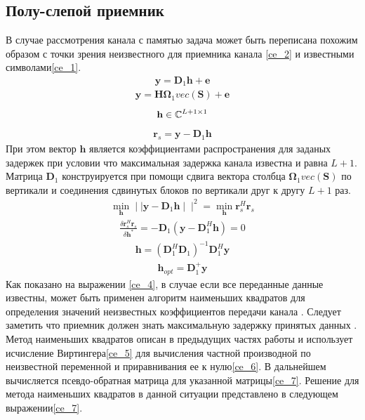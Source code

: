 \subsection{Полу-слепой приемник}
В случае рассмотрения канала с памятью задача может быть переписана похожим образом с точки зрения неизвестного для приемника канала \eqref{ce_2}  и известными символами\eqref{ce_1}.
\begin{align}
\mathbf{y}=\mathbf{D}_1\mathbf{h}+\mathbf{e}
\label{ce_1}
\end{align}
\begin{align}
\mathbf{y}=\mathbf{H}\mathbf{\Omega}_1vec(\mathbf{S})+\mathbf{e}
\label{ce_2}
\end{align}
\begin{align*}
\mathbf{h}\in\mathbb{C}^{L+1\times 1}
\end{align*}
\begin{align}
\mathbf{r}_s=\mathbf{y}-\mathbf{D}_1\mathbf{h}
\label{ce_3}
\end{align}
При этом вектор $\mathbf{h}$  является коэффициентами распространения для заданых задержек при условии что максимальная задержка канала известна и равна $L+1$. Матрица $\mathbf{D}_1$ конструируется при помощи сдвига вектора столбца $\mathbf{\Omega}_1vec(\mathbf{S})$ по вертикали и  соединения сдвинутых блоков по вертикали друг к другу $L+1$ раз\cite{Book53}.
\begin{align}
\min_{\mathbf{h}} \mid \mid\mathbf{y}-\mathbf{D}_1\mathbf{h} \mid \mid^2=\min_{\mathbf{h}}\mathbf{r}_s^H\mathbf{r}_s
\label{ce_4}
\end{align}
\begin{align}
\frac{\delta\mathbf{r}_s^H\mathbf{r}_s}{\delta\mathbf{h}^*}=-\mathbf{D}_1(\mathbf{y}-\mathbf{D}_1^H\mathbf{h})=0
\label{ce_5}
\end{align}
\begin{align}
\mathbf{h}=(\mathbf{D}_1^H\mathbf{D}_1)^{-1}\mathbf{D}_1^H\mathbf{y}
\label{ce_6}
\end{align}
\begin{align}
\mathbf{h}_{opt}=\mathbf{D}_1^+\mathbf{y}
\label{ce_7}
\end{align}
Как показано на выражении \eqref{ce_4}, в случае если все переданные данные известны, может быть применен алгоритм наименьших квадратов для определения значений неизвестных коэффициентов передачи канала \cite{Book47}. Следует заметить что приемник должен знать максимальную задержку принятых данных . Метод наименьших квадратов описан в предыдущих частях работы и использует исчисление Виртингера\eqref{ce_5} для вычисления частной производной по неизвестной переменной и приравнивания ее к нулю\eqref{ce_6}. В дальнейшем вычисляется псевдо-обратная матрица для указанной матрицы\eqref{ce_7}. Решение для метода наименьших квадратов в данной ситуации представлено в следующем выражении\eqref{ce_7}. 
